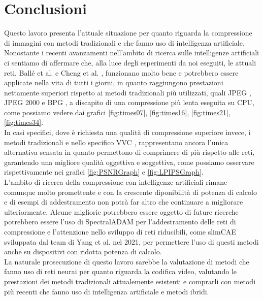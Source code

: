 \chapter{Conclusioni}
Questo lavoro presenta l’attuale situazione per quanto riguarda la compressione di immagini con metodi tradizionali e che fanno uso di intelligenza artificiale. Nonostante i recenti avanzamenti nell’ambito di ricerca sulle intelligenze artificiali ci sentiamo di affermare che, alla luce degli esperimenti da noi eseguiti, le attuali reti, Ballé et al. \cite{minnen2018joint} e Cheng et al. \cite{cheng2020learned}, funzionano molto bene e potrebbero essere applicate nella vita di tutti i giorni, in quanto raggiungono prestazioni nettamente superiori rispetto ai metodi tradizionali più utilizzati, quali JPEG \cite{125072}, JPEG 2000 \cite{952804} e BPG \cite{BPGImageformat}, a discapito di una compressione più lenta eseguita su CPU, come possiamo vedere dai grafici \ref{fig:times07}, \ref{fig:times16}, \ref{fig:times21}, \ref{fig:times34}.\\
In casi specifici, dove è richiesta una qualità di compressione superiore invece, i metodi tradizionali e nello specifico VVC \cite{9503377}, rappresentano ancora l’unica alternativa sensata in quanto permettono di comprimere di più rispetto alle reti, garantendo una migliore qualità oggettiva e soggettiva, come possiamo osservare rispettivamente nei grafici \ref{fig:PSNRGraph} e \ref{fig:LPIPSGraph}.\\
L’ambito di ricerca della compressione con intelligenze artificiali rimane comunque molto promettente e con la crescente diponibilità di potenza di calcolo e di esempi di addestramento non potrà far altro che continuare a migliorare ulteriormente. Alcune migliorie potrebbero essere oggetto di future ricerche potrebbero essere l’uso di SpectralADAM \cite{balle2018efficient} per l’addestramento delle reti di compressione e l’attenzione nello sviluppo di reti riducibili, come slimCAE \cite{yang2021slimmable} sviluppata dal team di Yang et al. nel 2021, per permettere l’uso di questi metodi anche su dispositivi con ridotta potenza di calcolo.\\
La naturale prosecuzione di questo lavoro sarebbe la valutazione di metodi che fanno uso di reti neurai per quanto riguarda la codifica video, valutando le prestazioni dei metodi tradizionali attualemente esistenti e comprarli con metodi più recenti che fanno uso di intelligenza artificiale e metodi ibridi.\\
